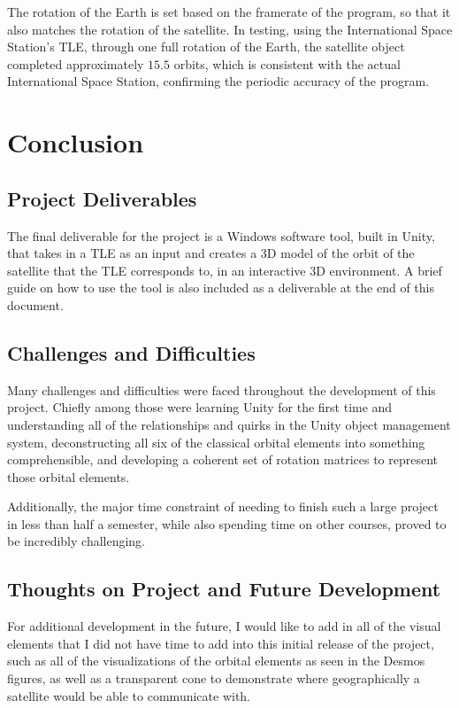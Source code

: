 \documentclass[conference]{IEEEtran}
\begin{document}
			The rotation of the Earth is set based on the framerate of the program, so that it also matches the rotation of the satellite. In testing, using the International Space Station's TLE, through one full rotation of the Earth, the satellite object completed approximately \( 15.5 \) orbits, which is consistent with the actual International Space Station, confirming the periodic accuracy of the program.

	\section{Conclusion}

		\subsection{Project Deliverables}
			The final deliverable for the project is a Windows software tool, built in Unity, that takes in a TLE as an input and creates a 3D model of the orbit of the satellite that the TLE corresponds to, in an interactive 3D environment. A brief guide on how to use the tool is also included as a deliverable at the end of this document.

		\subsection{Challenges and Difficulties}
			Many challenges and difficulties were faced throughout the development of this project. Chiefly among those were learning Unity for the first time and understanding all of the relationships and quirks in the Unity object management system, deconstructing all six of the classical orbital elements into something comprehensible, and developing a coherent set of rotation matrices to represent those orbital elements.

			Additionally, the major time constraint of needing to finish such a large project in less than half a semester, while also spending time on other courses, proved to be incredibly challenging.

		\subsection{Thoughts on Project and Future Development}
			For additional development in the future, I would like to add in all of the visual elements that I did not have time to add into this initial release of the project, such as all of the visualizations of the orbital elements as seen in the Desmos figures, as well as a transparent cone to demonstrate where geographically a satellite would be able to communicate with.
\end{document}
